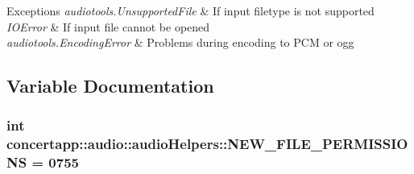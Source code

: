 \begin{DoxyExceptions}{Exceptions}
{\em audiotools.UnsupportedFile} & If input filetype is not supported \\
\hline
{\em IOError} & If input file cannot be opened \\
\hline
{\em audiotools.EncodingError} & Problems during encoding to PCM or ogg \\
\hline
\end{DoxyExceptions}


\subsection{Variable Documentation}
\hypertarget{namespaceconcertapp_1_1audio_1_1audio_helpers_a201ef15ed1aaddff61c6c28a212e330d}{
\subsubsection[{NEW\_\-FILE\_\-PERMISSIONS}]{\setlength{\rightskip}{0pt plus 5cm}int {\bf concertapp::audio::audioHelpers::NEW\_\-FILE\_\-PERMISSIONS} = 0755}}
\label{namespaceconcertapp_1_1audio_1_1audio_helpers_a201ef15ed1aaddff61c6c28a212e330d}
